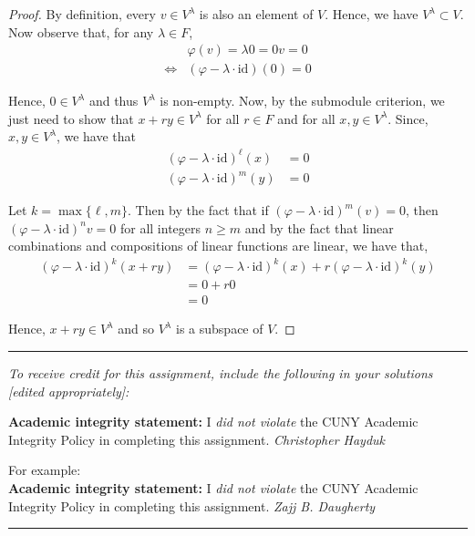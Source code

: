 \documentclass[11pt, reqno]{amsart}
\theoremstyle{plain}
\theoremstyle{definition}
\theoremstyle{example}
\newcommand{\NOTE}[1]{{\color{blue}#1}}
\def\id{\mathrm{id}}
\def\f{\varphi}
\begin{document}
\begin{enumerate}[1.]
\begin{enumerate}[(a)]
\begin{enumerate}[(i)]
\begin{proof}
By definition, every $v \in V^{\lambda}$ is also an element of $V$. Hence, we have $V^{\lambda} \subset V$. Now observe that, for any $\lambda \in F$,
\begin{align*}
&\f(v) = \lambda 0 = 0v = 0\\
\iff &(\f - \lambda \cdot \id)(0) = 0
\end{align*} 

Hence, $0 \in V^{\lambda}$ and thus $V^\lambda$ is non-empty. Now, by the submodule criterion, we just need to show that $x + ry \in V^{\lambda}$ for all $r \in F$ and for all $x, y \in V^{\lambda}$. Since, $x, y \in V^{\lambda}$, we have that 
\begin{align*}
(\f - \lambda \cdot \id)^{\ell}(x) &= 0\\
(\f - \lambda \cdot \id)^{m}(y) &= 0
\end{align*}

Let $k = \max\{\ell, m\}$. Then by the fact that if $(\f - \lambda \cdot \id)^m (v) = 0$, then $(\f - \lambda \cdot \id)^n v = 0$ for all integers $n \ge m$ and by the fact that linear combinations and compositions of linear functions are linear, we have that,
\begin{align*}
(\f - \lambda \cdot \id)^k (x + ry) &= (\f - \lambda \cdot \id)^k(x) + r (\f - \lambda \cdot \id)^k(y)\\
&= 0 + r0\\
&= 0
\end{align*}

Hence, $x + ry \in V^{\lambda}$ and so $V^{\lambda}$ is a subspace of $V$.
\end{proof}

\end{enumerate}



\end{enumerate}
\end{enumerate}

\vfill


\hrule
\emph{\small To receive credit for this assignment, include the following in your solutions [edited appropriately]:}

\smallskip

\textbf{Academic integrity statement:} I \emph{did not violate} the CUNY Academic Integrity Policy in completing this assignment. \hfill \emph{Christopher Hayduk}


\medskip

\NOTE{For example:\\
\textbf{Academic integrity statement:} I \emph{did not violate} the CUNY Academic Integrity Policy in completing this assignment. \hfill \emph{Zajj B. Daugherty}}
\medskip
\hrule

\vfill
\end{document}
